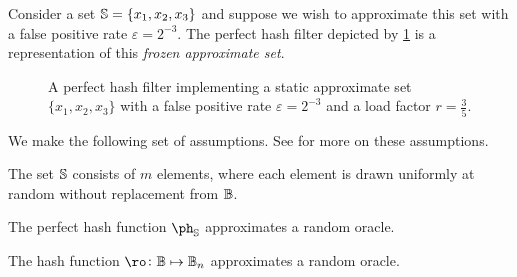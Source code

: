 \documentclass[ ../main.tex]{subfiles}
\begin{document}
\begin{example}
Consider a set $\mathbb{S} = \{x_1, x_2, x_3\}$ and suppose we wish to approximate this set with a false positive rate $\varepsilon = 2^{-3}$. The perfect hash filter depicted by \cref{fig:PHFilter} is a representation of this \emph{frozen approximate set}.
\end{example}
\begin{figure}
\caption[Perfect hash filter]{A perfect hash filter implementing a static approximate set $\{x_1,x_2,x_3\}$ with a false positive rate $\varepsilon = 2^{-3}$ and a load factor $r = \frac{3}{5}$.}
\label{fig:PHFilter}
\centering

\end{figure}

We make the following set of assumptions. See \cite{oph} for more on these assumptions.
\begin{assumption}
The set $\mathbb{S}$ consists of $m$ elements, where each element is drawn uniformly at random without replacement from $\mathbb{B}$.
\end{assumption}
\begin{assumption}
The perfect hash function $\ph_{\St}$ approximates a random oracle.
\end{assumption}
\begin{assumption}
\label{asm:ro}
The hash function $\ro \colon \cisb \mapsto \cisb_n$ approximates a random oracle.
\end{assumption}
\end{document}
